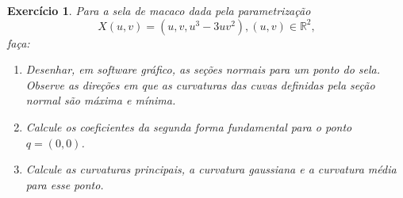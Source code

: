 \documentclass[a4paper,12pt]{article}
\newcommand{\R}{\mathbb{R}}
\theoremstyle{exer}
\newtheorem{exercise}{Exercício}
\theoremstyle{definition}
\theoremstyle{plain}
\begin{document}
\begin{exercise}
    Para a sela de macaco dada pela parametrização 
    $$X(u, v) = (u, v,
    u^3- 3uv^2), (u, v) \in \R^2,$$ faça:
    \begin{enumerate}
        \item[(a)] Desenhar, em software gráfico, as seções normais para um ponto do sela.
        Observe as direções em que as curvaturas das cuvas definidas pela seção normal
        são máxima e mínima.
        \item[(b)] Calcule os coeficientes da segunda forma fundamental para o ponto $q =
        (0, 0)$.
        \item[(c)] Calcule as curvaturas principais, a curvatura gaussiana e a curvatura média para
        esse ponto.
    \end{enumerate}
\end{exercise}
\end{document}
